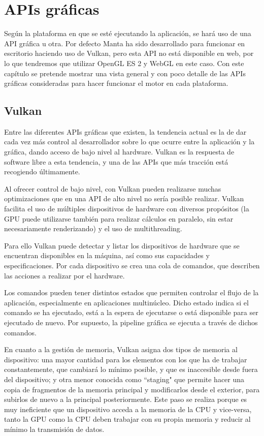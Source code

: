 \section{APIs gráficas}
\label{APIS}

Según la plataforma en que se esté ejecutando la aplicación, se hará uso de una API gráfica u otra. Por defecto Manta ha sido desarrollado para funcionar en escritorio haciendo uso de Vulkan, pero esta API no está disponible en web, por lo que tendremos que utilizar OpenGL ES 2 y WebGL en este caso. Con este capítulo se pretende mostrar una vista general y con poco detalle de las APIs gráficas consideradas para hacer funcionar el motor en cada plataforma.

\subsection{Vulkan}
\label{vulkan_api}
Entre las diferentes APIs gráficas que existen, la tendencia actual es la de dar cada vez más control al desarrollador sobre lo que ocurre entre la aplicación y la gráfica, dando acceso de bajo nivel al hardware. Vulkan es la respuesta de software libre a esta tendencia, y una de las APIs que más tracción está recogiendo últimamente.

Al ofrecer control de bajo nivel, con Vulkan pueden realizarse muchas optimizaciones que en una API de alto nivel no sería posible realizar. Vulkan facilita el uso de múltiples dispositivos de hardware con diversos propósitos (la GPU puede utilizarse también para realizar cálculos en paralelo, sin estar necesariamente renderizando) y el uso de multithreading.

Para ello Vulkan puede detectar y listar los dispositivos de hardware que se encuentran disponibles en la máquina, así como sus capacidades y especificaciones. Por cada dispositivo se crea una cola de comandos, que describen las acciones a realizar por el hardware.

Los comandos pueden tener distintos estados que permiten controlar el flujo de la aplicación, especialmente en aplicaciones multinúcleo. Dicho estado indica si el comando se ha ejecutado, está a la espera de ejecutarse o está disponible para ser ejecutado de nuevo. Por supuesto, la pipeline gráfica se ejecuta a través de dichos comandos.

En cuanto a la gestión de memoria, Vulkan asigna dos tipos de memoria al dispositivo: una mayor cantidad para los elementos con los que ha de trabajar constantemente, que cambiará lo mínimo posible, y que es inaccesible desde fuera del dispositivo; y otra menor conocida como ``staging" que permite hacer una copia de fragmentos de la memoria principal y modificarlos desde el exterior, para subirlos de nuevo a la principal posteriormente. Este paso se realiza porque es muy ineficiente que un dispositivo acceda a la memoria de la CPU y vice-versa, tanto la GPU como la CPU deben trabajar con su propia memoria y reducir al mínimo la transmisión de datos.

